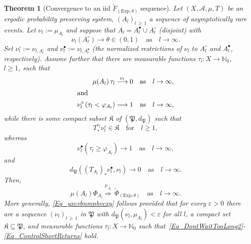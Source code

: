 \documentclass[10pt]{amsart}
\newtheorem{theo}{Theorem}[section]
\theoremstyle{definition}\newtheorem{defi}[theo]{Definition}\newtheorem{rema}[theo]{Remark}\newtheorem{exam}[theo]{Example}\newtheorem{exem}[theo]{Example}\newtheorem{nota}[theo]{Notation}
\newcommand{\clA}{\mathcal{A}}
\newcommand{\Expl}{\mathrm{Exp}}
\newcommand{\frkK}{\mathfrak{K}}
\newcommand{\frkP}{\mathfrak{P}}
\newcommand{\bbN}{\mathbb{N}}
\begin{document}
\begin{theo}[{Convergence to an iid  $\widetilde{F}_{(\Expl,\theta)}$ sequence}]\label{T_CPoissonViaCompactness}
Let $(X,\clA,\mu,T)$ be an ergodic probability preserving system, $(A_{l})_{l\,\geq\,1}$ a sequence of asymptotically rare events. Let $\nu_{l}:=\mu_{A_{l}}$ and suppose that $A_{l}=A_{l}^{\bullet}\cup A_{l}^{\circ}$ (disjoint) with
\begin{equation}\label{Eq_CompundingTheProportion}
\nu_{l}(A_{l}^{\circ})\longrightarrow\theta\in(0,1)\quad\text{as}\quad l\rightarrow\infty. 
\end{equation}
Set $\nu_{l}^{\circ}:=\nu_{l,A_{l}^{\circ}}$ and $\nu_{l}^{\bullet} :=\nu_{l,A_{l}^{\bullet}}$ (the normalized restrictions of $\nu_{l}$ to $A_{l}^{\circ}$ and $A_{l}^{\bullet}$, respectively). Assume further that there are measurable functions $\tau_{l}:X\rightarrow\bbN_{0}$, $l\geq 1$, such that
\begin{align}
\mu(A_{l})\,\tau_{l}\overset{\nu_{l}}{\longrightarrow}0 &\quad\text{as}\quad l\rightarrow\infty,\label{Eq_DontWaitTooLong2}
\\
\intertext{and}
\nu_{l}^{\circ}\left(\tau_{l}<\varphi_{A_{l}}\right) \longrightarrow 1 &\quad\text{as}\quad l\rightarrow\infty, \label{Eq_HardlyAnyReturnsUpToTimeM2}
\end{align}
while there is some compact subset $\frkK$ of $(\frkP,d_{\frkP})$ such that
\begin{equation}\label{Eq_TheFabulousCompactnessCondition2}
T_{\ast}^{\tau_{l}}\nu_{l}^{\circ}\in\frkK\quad\text{for}\quad l\geq1, 
\end{equation}
whereas
\begin{equation}\label{Eq_ManyHappyReturns}
\nu_{l}^{\bullet}\left(\tau_{l}\geq\varphi_{A_{l}}\right) \longrightarrow 1\quad\text{as}\quad l\rightarrow\infty, 
\end{equation}
and
\begin{equation}\label{Eq_ControlShortReturns}
d_{\frkP}\left(\left(T_{A_{l}}\right)_{\ast}\nu_{l}^{\bullet},\nu_{l}\right)\longrightarrow 0\quad\text{as}\quad l\rightarrow\infty. 
\end{equation}
Then,
\begin{equation}
\mu(A_{l})\Phi_{A_{l}}\overset{\mu_{A_{l}}}{\Longrightarrow}\,\widetilde{\Phi }_{(\Expl,\theta)} \quad \text{as}\quad l\rightarrow\infty.\label{Eq_yxcvbnmnbvcxy}
\end{equation}
More generally, \eqref{Eq_yxcvbnmnbvcxy} follows provided that for every $\varepsilon>0$ there are a sequence $(\nu_{l})_{l\,\geq\,1}$ in $\frkP$ with $d_{\frkP}(\nu_{l},\mu_{A_{l}})<\varepsilon$ for all $l$, a compact set $\frkK\subseteq\frkP$, and measurable functions $\tau_{l}:X\rightarrow\bbN_{0}$ such that~\eqref{Eq_DontWaitTooLong2}-\eqref{Eq_ControlShortReturns} hold.
\end{theo}
\end{document}
